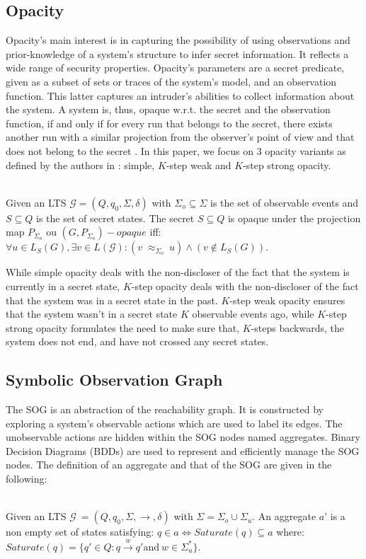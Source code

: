 \subsection{Opacity}
Opacity's main interest is in capturing the possibility of using observations and prior-knowledge of a system's structure to infer secret information. It reflects a wide range of security properties. Opacity's parameters are a secret predicate, given as a subset of sets or traces of the system's model, and an observation function. This latter captures an intruder's abilities to collect information about the system. A system is, thus, opaque w.r.t. the secret and the observation function, if and only if for every run that belongs to the secret, there exists another run with a similar projection from the observer's point of view and that does not belong to the secret \cite{Dubrieil2009, falcone, FengLin}.
In this paper, we focus on 3 opacity variants as defined by the authors in \cite{falcone}: simple, $K$-step weak and $K$-step strong opacity.
\begin{definition} \mbox{} \\
\small
	Given an LTS $\mathcal{G}=(Q,q_{0},\Sigma,\delta)$ with $\Sigma_{o} \subseteq \Sigma$ is the set of observable events and $S\subseteq Q$ is the set of secret states.
	The secret $S \subseteq Q$ is opaque under the projection map $P_{\Sigma_{o}}$ ou $(G, P_{\Sigma_{o}})-opaque$ iff: $ \forall u \in L_{S}(G), \exists v\in L(\mathcal{G}): (v\;\approx_{\Sigma_{o}} \: u) \wedge (v \notin L_{S}(G)).$
	\label{def:simpleop}
\end{definition}

While simple opacity deals with the non-discloser of the fact that the system is currently in a secret state, $K$-step opacity deals with the non-discloser of the fact that the system was in a secret state in the past. $K$-step weak opacity ensures that the system wasn't in a secret state $K$ observable events ago, while $K$-step strong opacity formulates the need to make sure that, $K$-steps backwards, the system does not end, and have not crossed any secret states.

\subsection{Symbolic Observation Graph}
The SOG is an abstraction of the reachability graph. It is constructed by exploring a system's observable actions which are used to label its edges. The unobservable actions are hidden within the SOG nodes named aggregates. Binary Decision Diagrams (BDDs) \cite{bryant92} are used to represent and efficiently manage the SOG nodes.
The definition of an aggregate and that of the SOG are given in the following:
\begin{definition}[Aggregate] \mbox{} \\
\small
	Given an LTS $\mathcal{G}\:=(Q,q_{0},\Sigma,\rightarrow, \delta)$ with $\Sigma = \Sigma_{o} \cup \Sigma_{u}$. An aggregate $a’$ is a non empty set of states satisfying: $q\in a \Leftrightarrow Saturate(q)\subseteq a$ where: $Saturate(q)=\{ q' \in Q :  q \xrightarrow{w} q' \text{and} \: w \in \Sigma^{*}_{u}\}.$
\end{definition}

